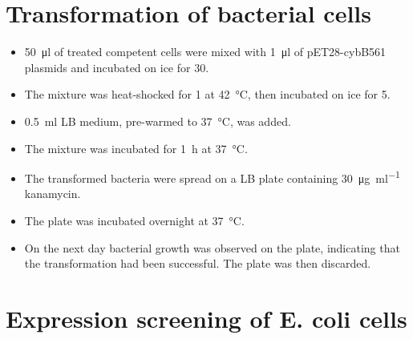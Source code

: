 \documentclass[a4paper]{scrreprt}
\begin{document}
\section{Transformation of bacterial cells}

\begin{itemize}
	\item \SI{50}{\ul} of  treated competent cells were mixed
		with \SI{1}{\ul} of pET28-cybB561 plasmids and incubated on ice
		for \SI{30}{\min}.
	\item The mixture was heat-shocked for \SI{1}{\min} at
		\SI{42}{\celsius}, then incubated on ice for \SI{5}{\min}.
	\item \SI{0.5}{\ml} LB medium, pre-warmed to \SI{37}{\celsius}, was
		added.
	\item The mixture was incubated for \SI{1}{\hour} at \SI{37}{\celsius}.
	\item The transformed bacteria were spread on a LB plate containing
		\SI{30}{\ug\per\ml} kanamycin.
	\item The plate was incubated overnight at \SI{37}{\celsius}.
	\item On the next day bacterial growth was observed on the plate,
		indicating that the transformation had been successful. The
		plate was then discarded.
\end{itemize}

\section{Expression screening of E. coli cells}
\end{document}

